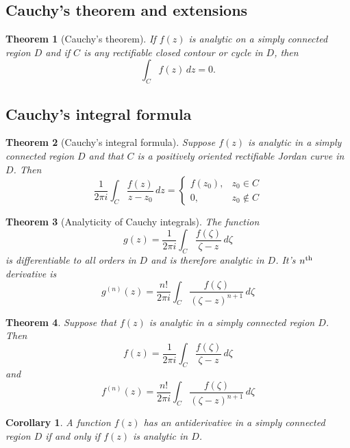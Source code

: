\documentclass[10pt, oneside, reqno]{amsart}
\theoremstyle{plain}%
\newtheorem{thm}{Theorem}[section]
\newtheorem*{cor}{Corollary}
\theoremstyle{definition}
\theoremstyle{remark}
\newcommand{\dzz}{\, dz}
\newcommand{\nth}{n\textsuperscript{th}}
\begin{document}
\subsection{Cauchy's theorem and extensions} %
\label{sec:cauchy_s_theorem_and_extensions}

\begin{thm}[Cauchy's theorem]
	If $f(z)$ is analytic on a simply connected region $D$ and if $C$ is any rectifiable closed contour or cycle in $D$, then \[
		\int_C f(z) \dzz = 0.
	\]
\end{thm}
	
	
	
\subsection{Cauchy's integral formula} %
\label{sec:cauchy_s_integral_formula}

\begin{thm}[Cauchy's integral formula]
	Suppose $f(z)$ is analytic in a simply connected region $D$ and that $C$ is a positively oriented rectifiable Jordan curve in $D$.  Then \[
		\frac{1}{2 \pi i} \int_C \frac{f(z)}{z - z_0} \dzz = \begin{cases}
			f(z_0), & z_0 \in C \\
			0,		& z_0 \notin C
		\end{cases}
	\]
\end{thm}


\begin{thm}[Analyticity of Cauchy integrals]
	The function \[
		g(z) = 	\frac{1}{2 \pi i} \int_C \frac{f(\zeta)}{\zeta- z} \, d \zeta
	\]
	is differentiable to all orders in $D$ and is therefore analytic in $D$.
	It's $\nth$ derivative is \[
		g^{(n)}(z) = 	\frac{n!}{2 \pi i} \int_C \frac{f(\zeta)}{(\zeta- z)^{n+1}} \, d \zeta	
	\]
\end{thm}
	
\begin{thm}
	Suppose that $f(z)$ is analytic in a simply connected region $D$.  Then \[
		f(z) = 	\frac{1}{2 \pi i} \int_C \frac{f(\zeta)}{\zeta- z} \, d \zeta	
	\] and \[
		f^{(n)}(z) = 	\frac{n!}{2 \pi i} \int_C \frac{f(\zeta)}{(\zeta- z)^{n+1}} \, d \zeta	
	\]
\end{thm}

\begin{cor}
	A function $f(z)$ has an antiderivative in a simply connected region $D$ if and only if $f(z)$ is analytic in $D$.
\end{cor}
\end{document}
